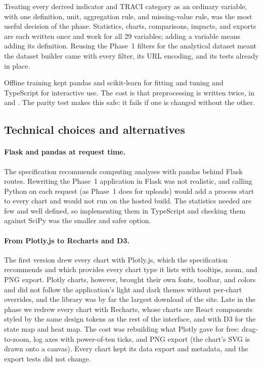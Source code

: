 \documentclass[11pt,a4paper]{article}
\begin{document}
Treating every derived indicator and TRACI category as an ordinary variable, with one
definition, unit, aggregation rule, and missing-value rule, was the most useful decision of the
phase. Statistics, charts, comparisons, impacts, and exports are each written once and work for
all 29 variables; adding a variable means adding its definition. Reusing the Phase~1 filters for
the analytical dataset meant the dataset builder came with every filter, its URL encoding, and
its tests already in place.

Offline training kept pandas and scikit-learn for fitting and tuning and TypeScript for
interactive use. The cost is that preprocessing is written twice, in  and
. The parity test makes this safe: it fails if one is changed without the other.

\subsection{Technical choices and alternatives}

\paragraph{Flask and pandas at request time.} The specification recommends computing analyses
with pandas behind Flask routes. Rewriting the Phase~1 application in Flask was not realistic,
and calling Python on each request (as Phase~1 does for uploads) would add a process start to
every chart and would not run on the hosted build. The statistics needed are few and well
defined, so implementing them in TypeScript and checking them against SciPy was the smaller and
safer option.

\paragraph{From Plotly.js to Recharts and D3.} The first version drew every chart with Plotly.js,
which the specification recommends and which provides every chart type it lists with tooltips,
zoom, and PNG export. Plotly charts, however, brought their own fonts, toolbar, and colors and did
not follow the application's light and dark themes without per-chart overrides, and the library
was by far the largest download of the site. Late in the phase we redrew every chart with
Recharts, whose charts are React components styled by the same design tokens as the rest of the
interface, and with D3 for the state map and heat map. The cost was rebuilding what Plotly gave
for free: drag-to-zoom, log axes with power-of-ten ticks, and PNG export (the chart's SVG is
drawn onto a canvas). Every chart kept its data export and metadata, and the export tests did
not change.
\end{document}
